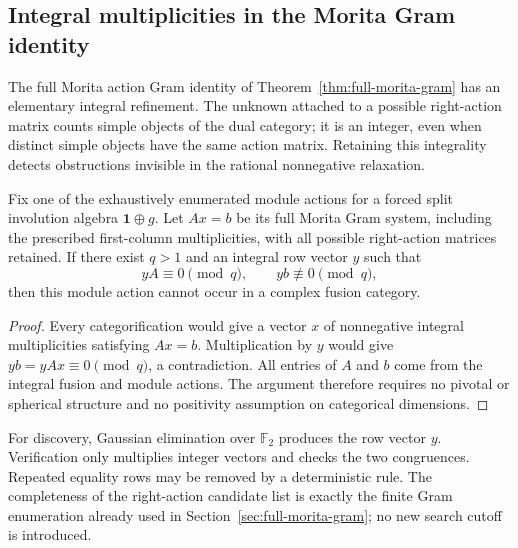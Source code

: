 \subsection{Integral multiplicities in the Morita Gram identity}
\label{sec:integral-morita-rotation}

The full Morita action Gram identity of
Theorem~\ref{thm:full-morita-gram} has an elementary integral refinement.
The unknown attached to a possible right-action matrix counts simple
objects of the dual category; it is an integer, even when distinct simple
objects have the same action matrix. Retaining this integrality detects
obstructions invisible in the rational nonnegative relaxation.

\begin{proposition}
\label{prop:morita-gram-congruence}
Fix one of the exhaustively enumerated module actions for a forced split
involution algebra $\mathbf1\oplus g$. Let $Ax=b$ be its full Morita Gram
system, including the prescribed first-column multiplicities, with all
possible right-action matrices retained. If there exist $q>1$ and an
integral row vector $y$ such that
\[
 yA\equiv0\pmod q,
 \qquad yb\not\equiv0\pmod q,
\]
then this module action cannot occur in a complex fusion category.
\end{proposition}
\begin{proof}
Every categorification would give a vector $x$ of nonnegative integral
multiplicities satisfying $Ax=b$. Multiplication by $y$ would give
$yb=yAx\equiv0\pmod q$, a contradiction. All entries of $A$ and $b$ come
from the integral fusion and module actions. The argument therefore
requires no pivotal or spherical structure and no positivity assumption
on categorical dimensions.
\end{proof}

For discovery, Gaussian elimination over $\mathbb F_2$ produces the row
vector $y$. Verification only multiplies integer vectors and checks the
two congruences. Repeated equality rows may be removed by a deterministic
rule. The completeness of the right-action candidate list is exactly the
finite Gram enumeration already used in
Section~\ref{sec:full-morita-gram}; no new search cutoff is introduced.

